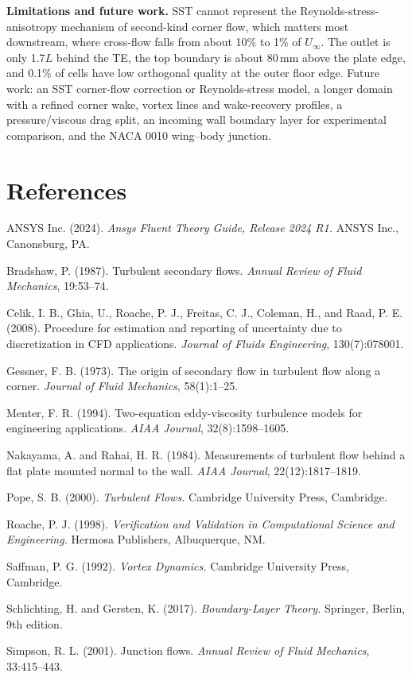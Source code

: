 \documentclass[12pt,a4paper,oneside]{report}
\newcommand{\Uinf}{U_\infty}
\begin{document}
{\small
\textbf{Limitations and future work.} SST cannot represent the Reynolds-stress-anisotropy mechanism of second-kind corner flow, which matters most downstream, where cross-flow falls from about 10\% to 1\% of $\Uinf$. The outlet is only 1.7$L$ behind the TE, the top boundary is about 80\,mm above the plate edge, and 0.1\% of cells have low orthogonal quality at the outer floor edge. Future work: an SST corner-flow correction or Reynolds-stress model, a longer domain with a refined corner wake, vortex lines and wake-recovery profiles, a pressure/viscous drag split, an incoming wall boundary layer for experimental comparison, and the NACA 0010 wing--body junction.
\par}

\chapter*{References}
\thispagestyle{plain}
\begin{list}{}{\setlength{\leftmargin}{1.5em}\setlength{\itemindent}{-1.5em}\setlength{\itemsep}{6pt}}
\item ANSYS Inc. (2024). \emph{Ansys Fluent Theory Guide, Release 2024 R1.} ANSYS Inc., Canonsburg, PA.
\item Bradshaw, P. (1987). Turbulent secondary flows. \emph{Annual Review of Fluid Mechanics}, 19:53--74.
\item Celik, I. B., Ghia, U., Roache, P. J., Freitas, C. J., Coleman, H., and Raad, P. E. (2008). Procedure for estimation and reporting of uncertainty due to discretization in CFD applications. \emph{Journal of Fluids Engineering}, 130(7):078001.
\item Gessner, F. B. (1973). The origin of secondary flow in turbulent flow along a corner. \emph{Journal of Fluid Mechanics}, 58(1):1--25.
\item Menter, F. R. (1994). Two-equation eddy-viscosity turbulence models for engineering applications. \emph{AIAA Journal}, 32(8):1598--1605.
\item Nakayama, A. and Rahai, H. R. (1984). Measurements of turbulent flow behind a flat plate mounted normal to the wall. \emph{AIAA Journal}, 22(12):1817--1819.
\item Pope, S. B. (2000). \emph{Turbulent Flows.} Cambridge University Press, Cambridge.
\item Roache, P. J. (1998). \emph{Verification and Validation in Computational Science and Engineering.} Hermosa Publishers, Albuquerque, NM.
\item Saffman, P. G. (1992). \emph{Vortex Dynamics.} Cambridge University Press, Cambridge.
\item Schlichting, H. and Gersten, K. (2017). \emph{Boundary-Layer Theory.} Springer, Berlin, 9th edition.
\item Simpson, R. L. (2001). Junction flows. \emph{Annual Review of Fluid Mechanics}, 33:415--443.
\end{list}
\end{document}
